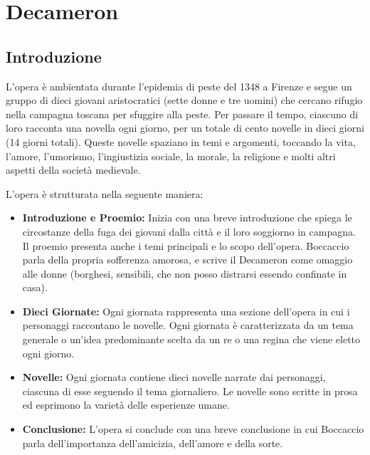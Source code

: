 \documentclass[a4paper]{article}
\begin{document}
\section{Decameron}

\subsection{Introduzione}

L'opera è ambientata durante l'epidemia di peste del 1348 a Firenze
e segue un gruppo di dieci giovani aristocratici (sette donne e tre uomini)
che cercano rifugio nella campagna toscana per sfuggire alla peste.
Per passare il tempo, ciascuno di loro racconta una novella ogni giorno,
per un totale di cento novelle in dieci giorni (14 giorni totali).
Queste novelle spaziano in temi e argomenti, toccando la vita, l'amore, l'umorismo,
l'ingiustizia sociale, la morale, la religione e molti altri aspetti della società medievale.

L'opera è strutturata nella seguente maniera:
\begin{itemize}
    \item \textbf{Introduzione e Proemio:} Inizia con una breve introduzione che spiega le circostanze della fuga dei giovani dalla città e il loro soggiorno in campagna. Il proemio presenta anche i temi principali e lo scopo dell'opera.
        Boccaccio parla della propria sofferenza amorosa, e scrive il Decameron come omaggio alle donne (borghesi, sensibili, che non posso distrarsi essendo confinate in casa).
    \item \textbf{Dieci Giornate:} Ogni giornata rappresenta una sezione dell'opera in cui i personaggi raccontano le novelle. Ogni giornata è caratterizzata da un tema generale o un'idea predominante scelta da un re o una regina che viene eletto ogni giorno.
    \item \textbf{Novelle:} Ogni giornata contiene dieci novelle narrate dai personaggi, ciascuna di esse seguendo il tema giornaliero. Le novelle sono scritte in prosa ed esprimono la varietà delle esperienze umane.
    \item \textbf{Conclusione:} L'opera si conclude con una breve conclusione in cui Boccaccio parla dell'importanza dell'amicizia, dell'amore e della sorte.
\end{itemize}

\end{document}
